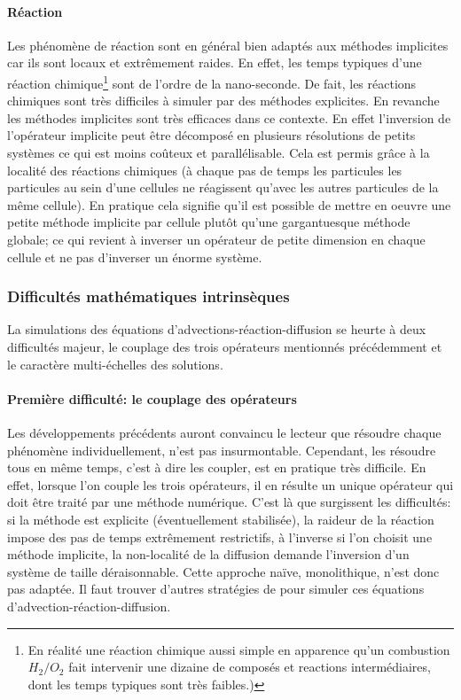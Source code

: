\paragraph{Réaction}
    Les phénomène de réaction sont en général bien adaptés aux méthodes implicites car ils sont locaux et extrêmement raides.
    En effet, les temps typiques d'une réaction chimique\footnote{
    En réalité une réaction chimique aussi simple en apparence qu'un combustion $H_2/O_2$ fait intervenir une dizaine de composés et reactions intermédiaires, dont les temps typiques sont très faibles.)} sont de l'ordre de la nano-seconde.
    De fait, les réactions chimiques sont très difficiles à simuler par des méthodes explicites.
    En revanche les méthodes implicites sont très efficaces dans ce contexte. En effet l'inversion de l'opérateur implicite 
    peut être décomposé en plusieurs résolutions de petits systèmes ce qui est moins coûteux et parallélisable. Cela est permis grâce à la localité des réactions chimiques
    (à chaque pas de temps les particules les particules au sein d'une cellules ne réagissent qu'avec les autres particules de la même cellule).
    En pratique cela signifie qu'il est possible de mettre en oeuvre une petite méthode implicite par cellule plutôt qu'une gargantuesque méthode globale; 
    ce qui revient à inverser un opérateur de petite dimension en chaque cellule et ne pas d'inverser un énorme système.

\subsubsection{Difficultés mathématiques intrinsèques}
    La simulations des équations d'advections-réaction-diffusion se heurte à deux difficultés majeur, le couplage des trois opérateurs mentionnés précédemment
    et le caractère multi-échelles des solutions.

    \paragraph{Première difficulté: le couplage des opérateurs}
        Les développements précédents auront convaincu le lecteur que résoudre chaque phénomène individuellement, n'est pas insurmontable. 
        Cependant, les résoudre tous en même temps, c'est à dire les coupler, est en pratique très difficile.
        En effet, lorsque l'on couple les trois opérateurs, il en résulte un unique opérateur qui doit être traité par une méthode numérique.
        C'est là que surgissent les difficultés: si la méthode est explicite (éventuellement stabilisée), la raideur de la réaction impose des pas de temps extrêmement restrictifs,
        à l'inverse si l'on choisit une méthode implicite, la non-localité de la diffusion demande l'inversion d'un système de taille déraisonnable. 
        Cette approche naïve, monolithique, n'est donc pas adaptée. Il faut trouver d'autres stratégies de pour simuler ces équations d’advection-réaction-diffusion.

